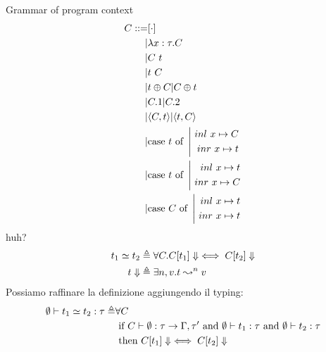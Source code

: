\documentclass{article}
\begin{document}
Grammar of program context
\begin{align*}
    C ::= & [\cdot] \\
    |& \lambda x:\tau.C \\
    |& C\ t \\
    |& t\ C \\
    |& t\oplus C | C\oplus t \\
    |& C.1 | C.2 \\
    |& \langle C,t\rangle | \langle t,C\rangle \\
    |& \text{case}\ t\ \text{of}\ \left|\begin{aligned}\ inl\  x\mapsto C\\\ inr\  x\mapsto t\end{aligned}\right. \\
    |& \text{case}\ t\ \text{of}\ \left|\begin{aligned}\ inl\  x\mapsto t\\\ inr\  x\mapsto C\end{aligned}\right. \\
    |& \text{case}\ C\ \text{of}\ \left|\begin{aligned}\ inl\  x\mapsto t\\\ inr\  x\mapsto t\end{aligned}\right. \\
\end{align*}
huh?
\begin{align*}
    t_1\simeq t_2 &\triangleq \forall C. C[t_1] \Downarrow \iff C[t_2]\Downarrow \\
    t\Downarrow &\triangleq \exists n,v.t\leadsto^n v
\end{align*}
Possiamo raffinare la definizione aggiungendo il typing:
\begin{align*}
    \emptyset \vdash t_1\simeq t_2:\tau \triangleq& \forall C \\
                                                  &\text{ if } C\vdash \emptyset : \tau\to\Gamma,\tau' \text{ and } \emptyset \vdash t_1:\tau \text{ and } \emptyset \vdash t_2:\tau \\
                                                  &\text{ then } C[t_1]\Downarrow \iff C[t_2]\Downarrow
\end{align*}
\end{document}
